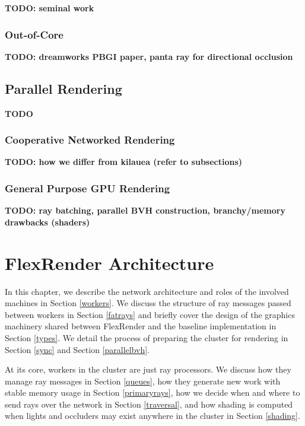 \documentclass[12pt]{ucthesis}
\begin{document}
\textbf{TODO: seminal work}

\subsection{Out-of-Core}
\label{outofcore}

\textbf{TODO: dreamworks PBGI paper, panta ray for directional occlusion}

\section{Parallel Rendering}
\label{parallelbg}

\textbf{TODO}

\subsection{Cooperative Networked Rendering}
\label{networked}

\textbf{TODO: how we differ from kilauea (refer to subsections) \cite{kato:2002}}

\subsection{General Purpose GPU Rendering}
\label{gpgpu}

\textbf{TODO: ray batching, parallel BVH construction, branchy/memory drawbacks (shaders)}

\chapter{FlexRender Architecture}
\label{architecture}

In this chapter, we describe the network architecture and roles of the involved
machines in Section \ref{workers}. We discuss the structure of ray messages
passed between workers in Section \ref{fatrays} and briefly cover the design of
the graphics machinery shared between FlexRender and the baseline implementation
in Section \ref{types}. We detail the process of preparing the cluster for
rendering in Section \ref{sync} and Section \ref{parallelbvh}.

At its core, workers in the cluster are just ray processors. We discuss how they
manage ray messages in Section \ref{queues}, how they generate new work with
stable memory usage in Section \ref{primaryrays}, how we decide when and where
to send rays over the network in Section \ref{traversal}, and how shading is computed
when lights and occluders may exist anywhere in the cluster in Section \ref{shading}.
\end{document}
